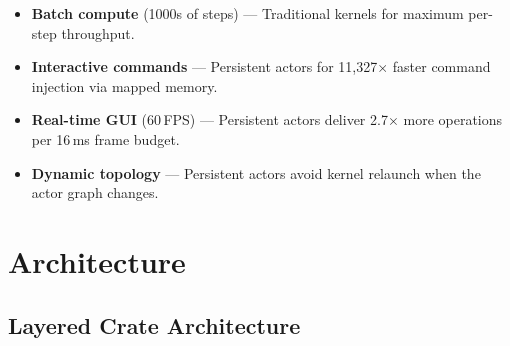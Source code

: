 \documentclass[11pt,a4paper]{article}
\begin{document}
\begin{tcolorbox}[keybox={When to Use Each Approach}]
\begin{itemize}[leftmargin=1.2em, itemsep=3pt]
  \item \textbf{Batch compute} (1000s of steps) --- Traditional kernels for
        maximum per-step throughput.
  \item \textbf{Interactive commands} --- Persistent actors for 11,327$\times$
        faster command injection via mapped memory.
  \item \textbf{Real-time GUI} (60\,FPS) --- Persistent actors deliver 2.7$\times$
        more operations per 16\,ms frame budget.
  \item \textbf{Dynamic topology} --- Persistent actors avoid kernel relaunch
        when the actor graph changes.
\end{itemize}
\end{tcolorbox}

\newpage
\section{Architecture}

\subsection{Layered Crate Architecture}
\end{document}
